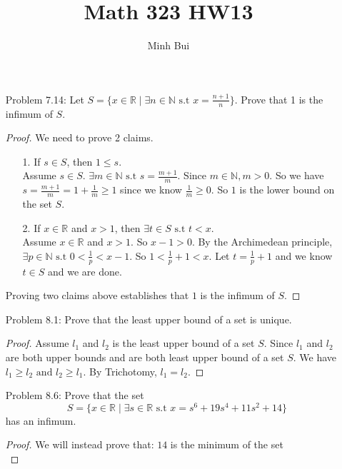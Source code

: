 \documentclass{article}
\author{Minh Bui}
\title{Math 323 HW13}
\theoremstyle{claim}
\theoremstyle{definition}
\begin{document}
\maketitle
\begin{enumerate}
    \item[Problem 7.14: ] Let $S = \{ x \in \mathbb{R} \mid \exists n \in \mathbb{N} \text{ s.t } x = \frac{n+1}{n} \}$. Prove that 1 is the infimum of $S$.
    \begin{proof}
        We need to prove 2 claims.
        \begin{enumerate}
            \item[1.] If $s \in S$, then $1 \le s$.\\
                Assume $s \in S$. $\exists m \in \mathbb{N} \text{ s.t } s = \frac{m+1}{m}$. Since $m \in \mathbb{N}, m > 0$. So we have $s = \frac{m+1}{m} = 1 + \frac{1}{m} \ge 1$ since we know $\frac{1}{m} \ge 0$. So $1$ is the lower bound on the set $S$.
            \item[2.] If $x \in \mathbb{R}$ and $x > 1$, then $\exists t \in S \text{ s.t } t < x$.\\
                Assume $x \in \mathbb{R}$ and $x > 1$. So $x - 1 > 0$. By the Archimedean principle, $\exists p \in \mathbb{N} \text{ s.t } 0 < \frac{1}{p} < x - 1$. So $1 < \frac{1}{p} + 1 < x$. Let $t = \frac{1}{p} + 1$ and we know $t \in S$ and we are done.
        \end{enumerate}
        Proving two claims above establishes that $1$ is the infimum of $S$.
    \end{proof}
    \item[Problem 8.1: ] Prove that the least upper bound of a set is unique.
    \begin{proof}
        Assume $l_1$ and $l_2$ is the least upper bound of a set $S$. Since $l_1$ and $l_2$ are both upper bounds and are both least upper bound of a set $S$. We have $l_1 \ge l_2 \text{ and } l_2 \ge l_1$. By Trichotomy, $l_1 = l_2$.
    \end{proof}
    \item[Problem 8.6: ] Prove that the set
        \begin{equation*}
            S = \{ x \in \mathbb{R} \mid \exists s \in \mathbb{R} \text{ s.t } x = s^6 + 19s^4 + 11s^2 +14\}
        \end{equation*}
        has an infimum.
    \begin{proof}
        We will instead prove that: $14$ is the minimum of the set
        \begin{equation*}

\end{equation*}
\end{proof}
\end{enumerate}
\end{document}
